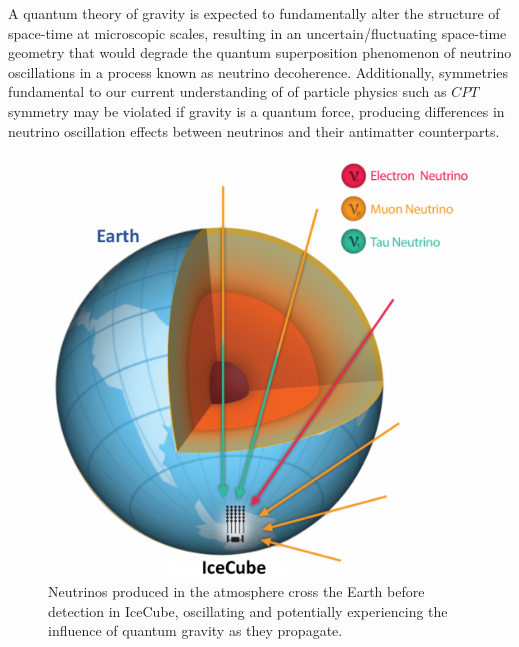 \documentclass[a4paper,11pt]{article}
\begin{document}
A quantum theory of gravity is expected to fundamentally alter the structure of space-time at microscopic scales, resulting in an uncertain/fluctuating space-time geometry that would degrade the quantum superposition phenomenon of neutrino oscillations in a process known as neutrino decoherence. Additionally, symmetries fundamental to our current understanding of of particle physics such as $CPT$ symmetry may be violated if gravity is a quantum force, producing differences in neutrino oscillation effects between neutrinos and their antimatter counterparts. 

\begin{figure} %
    \centering
		\includegraphics[width=1.\linewidth]{images/atmo_osc.png}
		\caption{Neutrinos produced in the atmosphere cross the Earth before detection in IceCube, oscillating and potentially experiencing the influence of quantum gravity as they propagate.}
		\vspace{-7pt}
		\label{fig:atmo_osc}
\end{figure}
\end{document}
